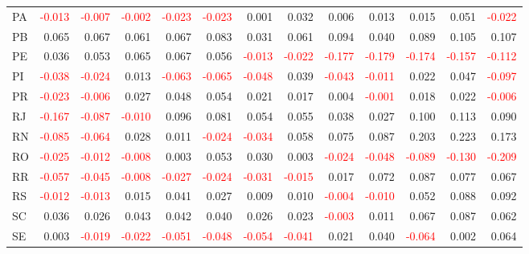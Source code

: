 \documentclass[a4paper,preprint,11pt,authoryear]{elsarticle}
\begin{document}
\begin{table}
{\begin{tabular}{lrrrrrrrrrrrr}
      PA & \textcolor{red}{-0.013} & \textcolor{red}{-0.007} & \textcolor{red}{-0.002} & \textcolor{red}{-0.023} & \textcolor{red}{-0.023} & 0.001 & 0.032 & 0.006 & 0.013 & 0.015 & 0.051 & \textcolor{red}{-0.022} \\
      PB & 0.065 & 0.067 & 0.061 & 0.067 & 0.083 & 0.031 & 0.061 & 0.094 & 0.040 & 0.089 & 0.105 & 0.107 \\
      PE & 0.036 & 0.053 & 0.065 & 0.067 & 0.056 & \textcolor{red}{-0.013} & \textcolor{red}{-0.022} & \textcolor{red}{-0.177} & \textcolor{red}{-0.179} & \textcolor{red}{-0.174} & \textcolor{red}{-0.157} & \textcolor{red}{-0.112} \\
      PI & \textcolor{red}{-0.038} & \textcolor{red}{-0.024} & 0.013 & \textcolor{red}{-0.063} & \textcolor{red}{-0.065} & \textcolor{red}{-0.048} & 0.039 & \textcolor{red}{-0.043} & \textcolor{red}{-0.011} & 0.022 & 0.047 & \textcolor{red}{-0.097} \\
      PR & \textcolor{red}{-0.023} & \textcolor{red}{-0.006} & 0.027 & 0.048 & 0.054 & 0.021 & 0.017 & 0.004 & \textcolor{red}{-0.001} & 0.018 & 0.022 & \textcolor{red}{-0.006} \\
      RJ & \textcolor{red}{-0.167} & \textcolor{red}{-0.087} & \textcolor{red}{-0.010} & 0.096 & 0.081 & 0.054 & 0.055 & 0.038 & 0.027 & 0.100 & 0.113 & 0.090 \\
      RN & \textcolor{red}{-0.085} & \textcolor{red}{-0.064} & 0.028 & 0.011 & \textcolor{red}{-0.024} & \textcolor{red}{-0.034} & 0.058 & 0.075 & 0.087 & 0.203 & 0.223 & 0.173 \\
      RO & \textcolor{red}{-0.025} & \textcolor{red}{-0.012} & \textcolor{red}{-0.008} & 0.003 & 0.053 & 0.030 & 0.003 & \textcolor{red}{-0.024} & \textcolor{red}{-0.048} & \textcolor{red}{-0.089} & \textcolor{red}{-0.130} & \textcolor{red}{-0.209} \\
      RR & \textcolor{red}{-0.057} & \textcolor{red}{-0.045} & \textcolor{red}{-0.008} & \textcolor{red}{-0.027} & \textcolor{red}{-0.024} & \textcolor{red}{-0.031} & \textcolor{red}{-0.015} & 0.017 & 0.072 & 0.087 & 0.077 & 0.067 \\
      RS & \textcolor{red}{-0.012} & \textcolor{red}{-0.013} & 0.015 & 0.041 & 0.027 & 0.009 & 0.010 & \textcolor{red}{-0.004} & \textcolor{red}{-0.010} & 0.052 & 0.088 & 0.092 \\
      SC & 0.036 & 0.026 & 0.043 & 0.042 & 0.040 & 0.026 & 0.023 & \textcolor{red}{-0.003} & 0.011 & 0.067 & 0.087 & 0.062 \\
      SE & 0.003 & \textcolor{red}{-0.019} & \textcolor{red}{-0.022} & \textcolor{red}{-0.051} & \textcolor{red}{-0.048} & \textcolor{red}{-0.054} & \textcolor{red}{-0.041} & 0.021 & 0.040 & \textcolor{red}{-0.064} & 0.002 & 0.064 \\

\end{tabular}}
\end{table}
\end{document}

